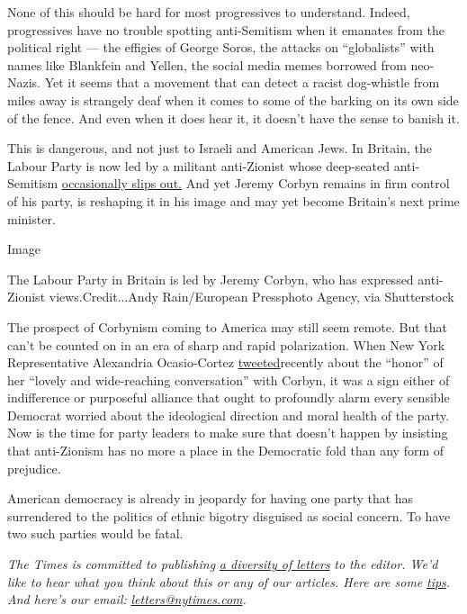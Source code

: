 None of this should be hard for most progressives to understand. Indeed,
progressives have no trouble spotting anti-Semitism when it emanates
from the political right --- the effigies of George Soros, the attacks
on ``globalists'' with names like Blankfein and Yellen, the social media
memes borrowed from neo-Nazis. Yet it seems that a movement that can
detect a racist dog-whistle from miles away is strangely deaf when it
comes to some of the barking on its own side of the fence. And even when
it does hear it, it doesn't have the sense to banish it.

This is dangerous, and not just to Israeli and American Jews. In
Britain, the Labour Party is now led by a militant anti-Zionist whose
deep-seated anti-Semitism
\href{https://www.nytimes.com/2018/08/27/opinion/jeremy-corbyn-anti-semitism-labour-britain.html}{occasionally
slips out.} And yet Jeremy Corbyn remains in firm control of his party,
is reshaping it in his image and may yet become Britain's next prime
minister.

Image

The Labour Party in Britain is led by Jeremy Corbyn, who has expressed
anti-Zionist views.Credit...Andy Rain/European Pressphoto Agency, via
Shutterstock

The prospect of Corbynism coming to America may still seem remote. But
that can't be counted on in an era of sharp and rapid polarization. When
New York Representative Alexandria Ocasio-Cortez
\href{https://twitter.com/AOC/status/1092210825228636161}{tweeted}recently
about the ``honor'' of her ``lovely and wide-reaching conversation''
with Corbyn, it was a sign either of indifference or purposeful alliance
that ought to profoundly alarm every sensible Democrat worried about the
ideological direction and moral health of the party. Now is the time for
party leaders to make sure that doesn't happen by insisting that
anti-Zionism has no more a place in the Democratic fold than any form of
prejudice.

American democracy is already in jeopardy for having one party that has
surrendered to the politics of ethnic bigotry disguised as social
concern. To have two such parties would be fatal.

\emph{The Times is committed to publishing}
\href{https://www.nytimes.com/2019/01/31/opinion/letters/letters-to-editor-new-york-times-women.html}{\emph{a
diversity of letters}} \emph{to the editor. We'd like to hear what you
think about this or any of our articles. Here are some}
\href{https://help.nytimes.com/hc/en-us/articles/115014925288-How-to-submit-a-letter-to-the-editor}{\emph{tips}}\emph{.
And here's our email:}
\href{mailto:letters@nytimes.com}{\emph{letters@nytimes.com}}\emph{.}

